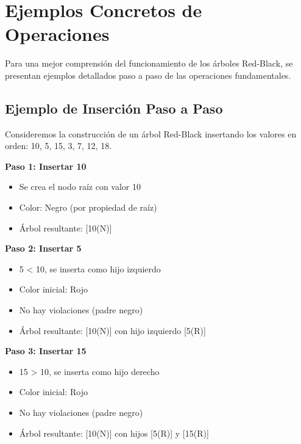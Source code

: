 \documentclass[conference]{IEEEtran}
\begin{document}

\section{Ejemplos Concretos de Operaciones}

Para una mejor comprensión del funcionamiento de los árboles Red-Black, se presentan ejemplos detallados paso a paso de las operaciones fundamentales.

\subsection{Ejemplo de Inserción Paso a Paso}

Consideremos la construcción de un árbol Red-Black insertando los valores en orden: 10, 5, 15, 3, 7, 12, 18.

\textbf{Paso 1: Insertar 10}
\begin{itemize}
    \item Se crea el nodo raíz con valor 10
    \item Color: Negro (por propiedad de raíz)
    \item Árbol resultante: [10(N)]
\end{itemize}

\textbf{Paso 2: Insertar 5}
\begin{itemize}
    \item 5 < 10, se inserta como hijo izquierdo
    \item Color inicial: Rojo
    \item No hay violaciones (padre negro)
    \item Árbol resultante: [10(N)] con hijo izquierdo [5(R)]
\end{itemize}

\textbf{Paso 3: Insertar 15}
\begin{itemize}
    \item 15 > 10, se inserta como hijo derecho
    \item Color inicial: Rojo
    \item No hay violaciones (padre negro)
    \item Árbol resultante: [10(N)] con hijos [5(R)] y [15(R)]
\end{itemize}
\end{document}
